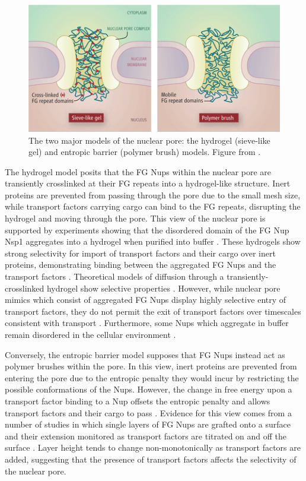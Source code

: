 \begin{figure}
\centering
\includegraphics[width=0.6\linewidth]{figs/ch01/elbaum}
\caption[Two important models of nuclear transport.]{The two major models of the nuclear pore: the hydrogel (sieve-like gel) and entropic barrier (polymer brush) models. Figure from \cite{elbaum06}.}
\label{fig:hydrogel-entropic-brush}
\end{figure}

The hydrogel model posits that the FG Nups within the nuclear pore are transiently crosslinked at their FG repeats into a hydrogel-like structure.  Inert proteins are prevented from passing through the pore due to the small mesh size, while transport factors carrying cargo can bind to the FG repeats, disrupting the hydrogel and moving through the pore.  This view of the nuclear pore is supported by experiments showing that the disordered domain of the FG Nup Nsp1 aggregates into a hydrogel when purified into buffer \cite{frey06}.  These hydrogels show strong selectivity for import of transport factors and their cargo over inert proteins, demonstrating binding between the aggregated FG Nups and the transport factors \cite{frey07,ader10,kim15}.  Theoretical models of diffusion through a transiently-crosslinked hydrogel show selective properties \cite{ribbeck01, bickel02,gu19}.   However, while nuclear pore mimics which consist of aggregated FG Nups display highly selective entry of transport factors, they do not permit the exit of transport factors over timescales consistent with transport \cite{frey07,ader10}.  Furthermore, some Nups which aggregate in buffer remain disordered in the cellular environment \cite{hough15}.

Conversely, the entropic barrier model supposes that FG Nups instead act as polymer brushes within the pore.  In this view, inert proteins are prevented from entering the pore due to the entropic penalty they would incur by restricting the possible conformations of the Nups.  However, the change in free energy upon a transport factor binding to a Nup offsets the entropic penalty and allows transport factors and their cargo to pass \cite{rout00, lim08}.  Evidence for this view comes from a number of studies in which single layers of FG Nups are grafted onto a surface and their extension monitored as transport factors are titrated on and off the surface \cite{wagner15,zahn16,vovk16}.  Layer height tends to change non-monotonically as transport factors are added, suggesting that the presence of transport factors affects the selectivity of the nuclear pore.

